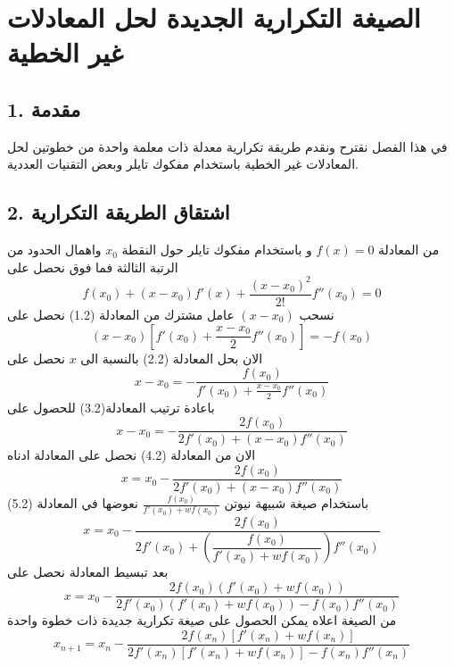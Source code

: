 \chapter{الصيغة التكرارية الجديدة لحل المعادلات غير الخطية}

\section*{1. مقدمة}
في هذا الفصل نقترح ونقدم طريقة تكرارية معدلة ذات معلمة واحدة من خطوتين لحل المعادلات غير الخطية باستخدام مفكوك تايلر وبعض التقنيات العددية.

\section*{2. اشتقاق الطريقة التكرارية}
من المعادلة $f(x)=0$ و باستخدام مفكوك تايلر حول النقطة $x_0$ واهمال الحدود من الرتبة الثالثة فما فوق نحصل على
\begin{equation}
f(x_0) + (x-x_0)f'(x) + \frac{(x-x_0)^2}{2!} f''(x_0) = 0 
\end{equation}
نسحب $(x-x_0)$ عامل مشترك من المعادلة (1.2) نحصل على
\begin{equation}
(x-x_0)\left[f'(x_0) + \frac{x-x_0}{2} f''(x_0)\right] = -f(x_0) 
\end{equation}
الان بحل المعادلة (2.2) بالنسبة الى $x$ نحصل على 
\begin{equation}
x-x_0 = - \frac{f(x_0)}{f'(x_0)+\frac{x-x_0}{2}f''(x_0)}
\end{equation}
باعادة ترتيب المعادلة(3.2) للحصول على
\begin{equation}
x-x_0 = - \frac{2f(x_0)}{2f'(x_0) + (x-x_0)f''(x_0)}
\end{equation}
الان من المعادلة (4.2) نحصل على المعادلة ادناه
\begin{equation}
x =x_0 - \frac{2f(x_0)}{2f'(x_0) + (x-x_0)f''(x_0)}
\end{equation}
باستخدام صيغة شبيهة نيوتن
$\frac{f(x_0)}{f'(x_0)+wf(x_0)}$
نعوضها في المعادلة (5.2)
	\[
x =x_0 - \frac{2f(x_0)}{2f'(x_0) + \left(\dfrac{f(x_0)}{f'(x_0)+wf(x_0)}\right)f''(x_0)} 
\]
بعد تبسيط المعادلة نحصل على
\begin{equation}
x = x_0 - \frac{2f(x_0)(f'(x_0)+wf(x_0))}{2f'(x_0)(f'(x_0)+wf(x_0)) - f(x_0)f''(x_0)} 
\end{equation}
من الصيغة اعلاه يمكن الحصول على صيغة تكرارية جديدة ذات خطوة واحدة
\begin{equation}
x_{n+1} = x_n - \frac{2f(x_n)[f'(x_n)+wf(x_n)]}{2f'(x_n)[f'(x_n)+wf(x_n)] - f(x_n)f''(x_n)} 
\end{equation}
